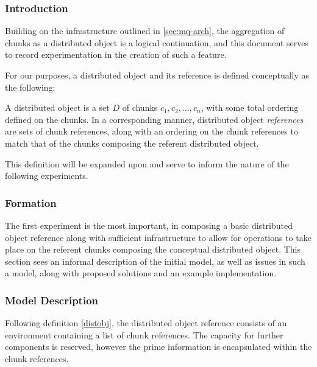 \subsubsection{Introduction}

Building on the infrastructure outlined in \ref{sec:mq-arch}, the aggregation of chunks as a distributed object is a logical continuation, and this document serves to record experimentation in the creation of such a feature.

For our purposes, a distributed object and its reference is defined conceptually as the following:

\begin{definition} \label{distobj} A distributed object is a set \(D\) of chunks \(c_1, c_2, \dots, c_n\), with some total ordering defined on the chunks.
	In a corresponding manner, distributed object \textit{references} are sets of chunk references, along with an ordering on the chunk references to match that of the chunks composing the referent distributed object.
\end{definition}

This definition will be expanded upon and serve to inform the nature of the following experiments.

\subsubsection{Formation}

The first experiment is the most important, in composing a basic distributed object reference along with sufficient infrastructure to allow for operations to take place on the referent chunks composing the conceptual distributed object.
This section sees an informal description of the initial model, as well as issues in such a model, along with proposed solutions and an example implementation.

\subsubsection{Model Description}

Following definition \cref{distobj}, the distributed object reference consists of an environment containing a list of chunk references.
The capacity for further components is reserved, however the prime information is encapsulated within the chunk references.

